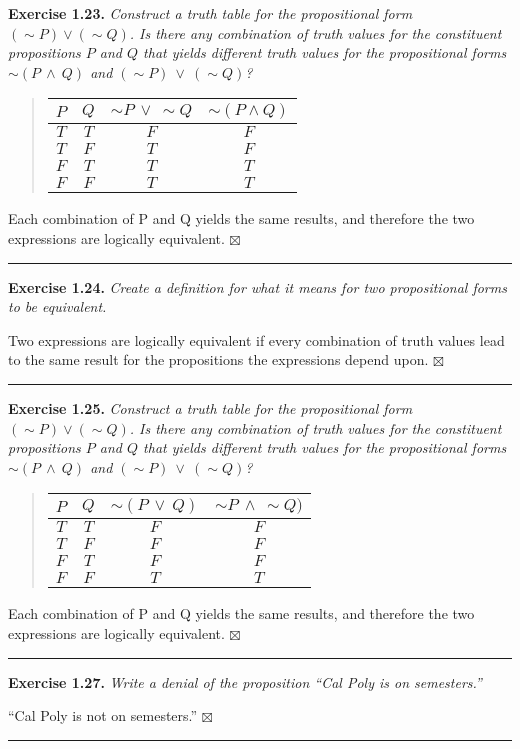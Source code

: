 \documentclass[a4paper,12pt]{article}
\newcommand{\entry}[3]
{
   \noindent\textbf{#1.}
   \emph{#2}
   \bigskip

   \noindent#3
   \bigskip
   \hrule
   \vspace{24pt}
}
\newcommand{\sig}{$\boxtimes$}
\begin{document}
\entry{Exercise 1.23}
{Construct a truth table for the propositional form $(\sim P )∨(\sim Q)$. Is there any combination of truth values for the constituent propositions $P$ and $Q$ that yields different truth values for the propositional forms $\sim(P~\land~Q)$ and $(\sim P)~\lor~(\sim Q)$?}
{
\begin{quote}
\begin{tabular}{|c|c|c|c|}
\hline
$P$ & $Q$ & $\sim P~\lor~\sim Q$ & $\sim(P \land Q)$\\
\hline
$T$ & $T$ & $F$ & $F$ \\
\hline
$T$ & $F$ & $T$ & $F$ \\
\hline
$F$ & $T$ & $T$ & $T$ \\
\hline
$F$ & $F$ & $T$ & $T$ \\
\hline
\end{tabular}
\end{quote}
Each combination of P and Q yields the same results, and therefore the two expressions are logically equivalent. \sig
}



\entry{Exercise 1.24}
{Create a definition for what it means for two propositional forms to be equivalent.}
{Two expressions are logically equivalent if every combination of truth values lead to the same result for the propositions the expressions depend upon. \sig}




\entry{Exercise 1.25}
{Construct a truth table for the propositional form $(\sim P )∨(\sim Q)$. Is there any combination of truth values for the constituent propositions $P$ and $Q$ that yields different truth values for the propositional forms $\sim(P~\land~Q)$ and $(\sim P)~\lor~(\sim Q)$?}
{
\begin{quote}
\begin{tabular}{|c|c|c|c|}
\hline
$P$ & $Q$ & $\sim(P~\lor~Q)$ & $\sim P~\land~\sim Q)$\\
\hline
$T$ & $T$ & $F$ & $F$ \\
\hline
$T$ & $F$ & $F$ & $F$ \\
\hline
$F$ & $T$ & $F$ & $F$ \\
\hline
$F$ & $F$ & $T$ & $T$ \\
\hline
\end{tabular}
\end{quote}
Each combination of P and Q yields the same results, and therefore the two expressions are logically equivalent. \sig
}



\entry{Exercise 1.27}
{Write a denial of the proposition ``Cal Poly is on semesters.''}
{``Cal Poly is not on semesters.'' \sig}
\end{document}
